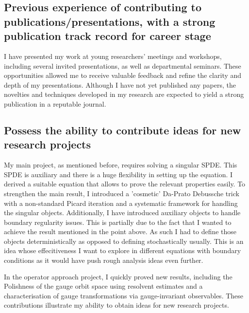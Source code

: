 \documentclass[12pt]{article}
\numberwithin{equation}{section}
\theoremstyle{definition}
\theoremstyle{remark}
\newcommand{\1}{\mathbf 1}
\newcommand{\<}{\langle}
\renewcommand{\>}{\rangle}
\begin{document}
\subsection{Previous experience of contributing to publications/presentations, with a strong publication track record for career stage}
I have presented my work at young researchers' meetings and workshops, including several invited presentations, as well as departmental seminars. These opportunities allowed me to receive valuable feedback and refine the clarity and depth of my presentations. Although I have not yet published any papers, the novelties and techniques developed in my research are expected to yield a strong publication in a reputable journal.

\subsection{Possess the ability to contribute ideas for new research projects}
My main project, as mentioned before, requires solving a singular SPDE. This SPDE is auxiliary and there is a huge flexibility in setting up the equation. I  derived a suitable equation that allows to prove the relevant properties easily.  To strengthen the main result, I introduced a 'cosmetic' Da-Prato Debussche trick  with a non-standard Picard iteration and  a systematic framework for handling the singular objects. Additionally, I have introduced auxiliary objects to handle boundary regularity issues. This is partially due to the fact that I wanted to achieve the result mentioned in the point above. As such I had to define those objects deterministically as opposed to defining stochastically usually. This is an idea whose effecitiveness I want to explore in different equations with boundary conditions as it would have push rough analysis ideas even further.  

In the operator approach project, I quickly proved new results, including the Polishness of the gauge orbit space using resolvent estimates and a characterisation of gauge transformations via gauge-invariant observables. These contributions illustrate my ability to obtain ideas for new research projects.  
\end{document}
